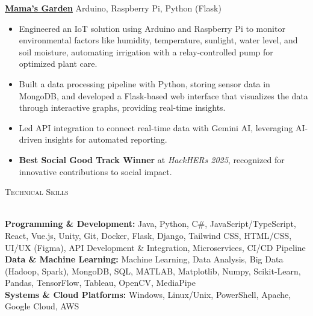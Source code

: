 \documentclass[a4paper]{article}
\newcommand{\lineunder} {
    \vspace*{-8pt} \\
    \hspace*{-18pt} \hrulefill \\
}
\newcommand{\header} [1] {
    {\hspace*{-18pt}\vspace*{6pt} \textsc{#1}}
    \vspace*{-6pt} \lineunder
}
\begin{document}
\vspace{-1mm}
\textbf{\href{https://devpost.com/software/mama-s-garden}{Mama's Garden}} \hfill Arduino, Raspberry Pi, Python (Flask)
\\
\vspace{-3mm}
\begin{itemize} \itemsep -3.5pt
    \item Engineered an IoT solution using Arduino and Raspberry Pi to monitor environmental factors like humidity, temperature, sunlight, water level, and soil moisture, automating irrigation with a relay-controlled pump for optimized plant care.
\item Built a data processing pipeline with Python, storing sensor data in MongoDB, and developed a Flask-based web interface that visualizes the data through interactive graphs, providing real-time insights.
\item Led API integration to connect real-time data with Gemini AI, leveraging AI-driven insights for automated reporting.
\item \textbf{Best Social Good Track Winner} at \textit{HackHERs 2025}, recognized for innovative contributions to social impact.
\end{itemize}
\vspace{-2mm}

\header{Technical Skills}
\vspace{0mm}

\textbf{Programming \& Development:} 
{\small
Java, Python, C\#, JavaScript/TypeScript, React, Vue.js, Unity, Git, Docker, Flask, Django, Tailwind CSS, HTML/CSS, UI/UX (Figma), API Development \& Integration, Microservices, CI/CD Pipeline\\
}
\textbf{Data \& Machine Learning:} 
{\small
Machine Learning, Data Analysis, Big Data (Hadoop, Spark), MongoDB, SQL, MATLAB, Matplotlib, Numpy, Scikit-Learn, Pandas, TensorFlow, Tableau, OpenCV, MediaPipe\\
}
\textbf{Systems \& Cloud Platforms:} 
{\small
Windows, Linux/Unix, PowerShell, Apache, Google Cloud, AWS
}
\end{document}
